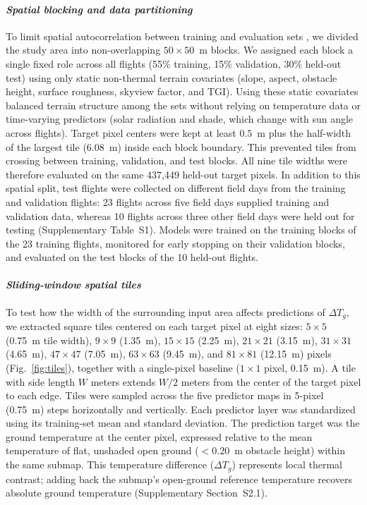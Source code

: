 \documentclass[12pt]{article}
\begin{document}
\paragraph*{\textit{Spatial blocking and data partitioning}}
To limit spatial autocorrelation between training and evaluation sets \citep{hastie2009elements, kuhn2013applied}, we divided the study area into non-overlapping $50\times50$~m blocks. We assigned each block a single fixed role across all flights (55\% training, 15\% validation, 30\% held-out test) using only static non-thermal terrain covariates (slope, aspect, obstacle height, surface roughness, skyview factor, and TGI). Using these static covariates balanced terrain structure among the sets without relying on temperature data or time-varying predictors (solar radiation and shade, which change with sun angle across flights). Target pixel centers were kept at least $0.5$~m plus the half-width of the largest tile ($6.08$~m) inside each block boundary. This prevented tiles from crossing between training, validation, and test blocks. All nine tile widths were therefore evaluated on the same 437,449 held-out target pixels. In addition to this spatial split, test flights were collected on different field days from the training and validation flights: 23 flights across five field days supplied training and validation data, whereas 10 flights across three other field days were held out for testing (Supplementary Table~S1). Models were trained on the training blocks of the 23 training flights, monitored for early stopping on their validation blocks, and evaluated on the test blocks of the 10 held-out flights.

\paragraph*{\textit{Sliding-window spatial tiles}}
To test how the width of the surrounding input area affects predictions of $\Delta T_g$, we extracted square tiles centered on each target pixel at eight sizes: $5\times5$ (0.75~m tile width), $9\times9$ (1.35~m), $15\times15$ (2.25~m), $21\times21$ (3.15~m), $31\times31$ (4.65~m), $47\times47$ (7.05~m), $63\times63$ (9.45~m), and $81\times81$ (12.15~m) pixels (Fig.~\ref{fig:tiles}), together with a single-pixel baseline ($1\times1$ pixel, 0.15~m). A tile with side length $W$ meters extends $W/2$ meters from the center of the target pixel to each edge. Tiles were sampled across the five predictor maps in 5-pixel (0.75~m) steps horizontally and vertically. Each predictor layer was standardized using its training-set mean and standard deviation. The prediction target was the ground temperature at the center pixel, expressed relative to the mean temperature of flat, unshaded open ground ($<0.20$~m obstacle height) within the same submap. This temperature difference ($\Delta T_g$) represents local thermal contrast; adding back the submap's open-ground reference temperature recovers absolute ground temperature (Supplementary Section~S2.1).
\end{document}
